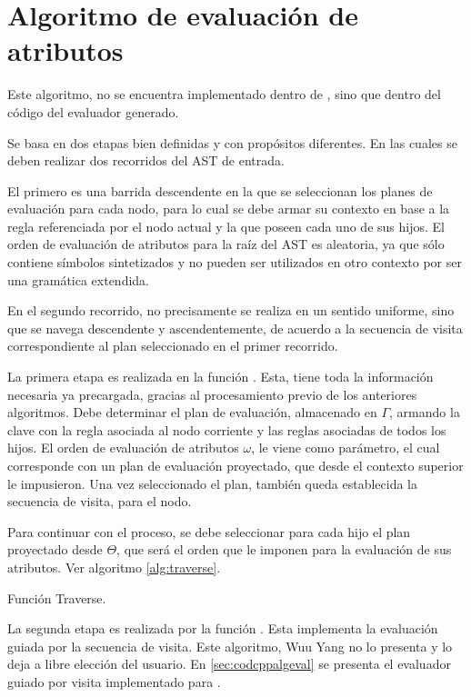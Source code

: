 \section{Algoritmo de evaluación de atributos}
\label{sec:algevalattr}

Este algoritmo, no se encuentra implementado dentro de \maggen, sino que dentro del código del evaluador generado.

Se basa en dos etapas bien definidas y con propósitos diferentes. En las cuales se deben realizar dos recorridos del AST de entrada.

El primero es una barrida descendente en la que se seleccionan los planes de evaluación para cada nodo, para lo cual se debe armar su contexto en base a la regla referenciada por el nodo actual y la que poseen cada uno de sus hijos. El orden de evaluación de atributos para la raíz del AST es aleatoria, ya que sólo contiene símbolos sintetizados y no pueden ser utilizados en otro contexto por ser una gramática extendida.

En el segundo recorrido, no precisamente se realiza en un sentido uniforme, sino que se navega descendente y ascendentemente, de acuerdo a la secuencia de visita correspondiente al plan seleccionado en el primer recorrido. 

La primera etapa es realizada en la función . Esta, tiene toda la información necesaria ya precargada, gracias al procesamiento previo de los anteriores algoritmos. Debe determinar el plan de evaluación, almacenado en $\Gamma$, armando la clave con la regla asociada al nodo corriente y las reglas asociadas de todos los hijos. El orden de evaluación de atributos $\omega$, le viene como parámetro, el cual corresponde con un plan de evaluación proyectado, que desde el contexto superior le impusieron. Una vez seleccionado el plan, también queda establecida la secuencia de visita, para el nodo.

Para continuar con el proceso, se debe seleccionar para cada hijo el plan proyectado desde $\Theta$, que será el orden que le imponen para la evaluación de sus atributos. Ver algoritmo \ref{alg:traverse}.

\begin{algorithm}[!ht]

\vspace{-0.5cm}
\caption{\label{alg:traverse}Función Traverse.}
\end{algorithm}

La segunda etapa es realizada por la función . Esta implementa la evaluación guiada por la secuencia de visita. Este algoritmo, Wuu Yang no lo presenta y lo deja a libre elección del usuario. En \ref{sec:codcppalgeval} se presenta el evaluador guiado por visita implementado para \maggen. 

